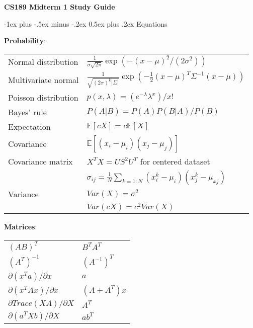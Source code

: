 \documentclass[10pt,landscape]{article}
\makeatletter
\renewcommand{\section}{\@startsection{section}{1}{0mm}%
                                {-1ex plus -.5ex minus -.2ex}%
                                {0.5ex plus .2ex}%
                                {\normalfont\large\bfseries}}
\makeatother
\begin{document}
\raggedright
\footnotesize
\begin{multicols}{3}


\setlength{\premulticols}{1pt}
\setlength{\postmulticols}{1pt}
\setlength{\multicolsep}{1pt}
\setlength{\columnsep}{2pt}

\begin{center}
\textbf{CS189 Midterm 1 Study Guide}
\end{center}



\section{Equations}

\textbf{Probability}:

\begin{tabular}{@{}ll@{}}
Normal distribution         & $\frac{1}{\sigma \sqrt{2\pi}}\exp(-(x-\mu)^2 / (2\sigma^2))$ \\
Multivariate normal         & $\frac{1}{\sqrt{(2\pi)^k |\Sigma|}} \exp(-\frac{1}{2}(x-\mu)^T \Sigma^{-1}(x-\mu))$ \\
Poisson distribution        & $p(x, \lambda) = (e^{-\lambda}\lambda^x)/x!$ \\
Bayes' rule                 & $P(A|B) = P(A)P(B|A) / P(B)$ \\
Expectation                 & $\mathbb{E}[cX] = c\mathbb{E}[X]$ \\
Covariance                  & $\mathbb{E}[(x_i - \mu_i)(x_j - \mu_j)]$ \\
Covariance matrix           & $X^T X = US^2 U^T$ for centered dataset \\
                            & $\sigma_{ij} = \frac{1}{N}\sum_{k=1:N} (x_i^k - \mu_i)(x_j^k - \mu_{xj})$ \\
Variance                    & $Var(X) = \sigma^2$ \\
                            & $Var(cX) = c^2 Var(X)$ \\
\end{tabular}

\textbf{Matrices}:

\begin{tabular}{@{}ll@{}}
$(AB)^T$                            & $B^T A^T$ \\
$(A^T)^{-1}$                        & $(A^{-1})^T$ \\
$\partial(x^T a) / \partial x$      & $a$ \\
$\partial(x^T Ax) / \partial x$     & $(A + A^T) x$ \\
$\partial Trace(XA) / \partial X$   & $A^T$ \\
$\partial(a^T Xb) / \partial X$     & $ab^T$
\end{tabular}


\end{multicols}
\end{document}
